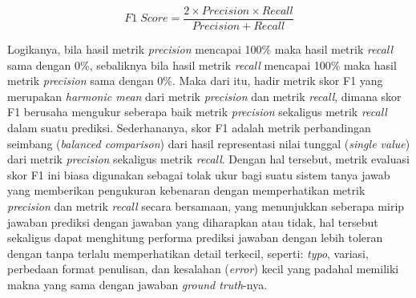 \begin{equation}
F1 \; Score = \frac{2 \times Precision \times Recall}{Precision + Recall}
\end{equation}

Logikanya, bila hasil metrik \emph{precision} mencapai 100\% maka hasil metrik \emph{recall} sama dengan 0\%, sebaliknya bila hasil metrik \emph{recall} mencapai 100\% maka hasil metrik \emph{precision} sama dengan 0\%. Maka dari itu, hadir metrik skor F1 yang merupakan \emph{harmonic mean} dari metrik \emph{precision} dan metrik \emph{recall}, dimana skor F1 berusaha mengukur seberapa baik metrik \emph{precision} sekaligus metrik \emph{recall} dalam suatu prediksi. Sederhananya, skor F1 adalah metrik perbandingan seimbang (\emph{balanced comparison}) dari hasil representasi nilai tunggal (\emph{single value}) dari metrik \emph{precision} sekaligus metrik \emph{recall}. Dengan hal tersebut, metrik evaluasi skor F1 ini biasa digunakan sebagai tolak ukur bagi suatu sistem tanya jawab yang memberikan pengukuran kebenaran dengan memperhatikan metrik \emph{precision} dan metrik \emph{recall} secara bersamaan, yang menunjukkan seberapa mirip jawaban prediksi dengan jawaban yang diharapkan atau tidak, hal tersebut sekaligus dapat menghitung performa prediksi jawaban dengan lebih toleran dengan tanpa terlalu memperhatikan detail terkecil, seperti: \emph{typo}, variasi, perbedaan format penulisan, dan kesalahan (\emph{error}) kecil yang padahal memiliki makna yang sama dengan jawaban \emph{ground truth}-nya.
